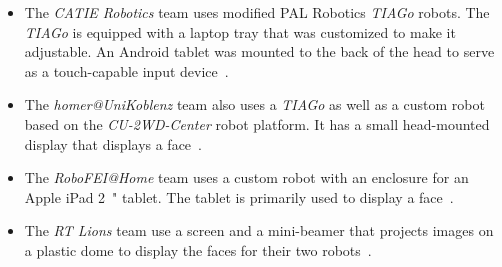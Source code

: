 \begin{itemize}
    \item The \textit{CATIE Robotics} team uses modified PAL Robotics \textit{TIAGo} robots. The
          \textit{TIAGo} is equipped with a laptop tray that was customized to make it adjustable.
          An Android tablet was mounted to the back of the head to serve as a touch-capable input
          device~\cite{catie-robotics-tdp}.
    \item The \textit{homer@UniKoblenz} team also uses a \textit{TIAGo} as well as a custom robot based
          on the \textit{CU-2WD-Center} robot platform. It has a small head-mounted display that displays
          a face~\cite{homer-at-uni-koblenz-tdp}.
    \item The \textit{RoboFEI@Home} team uses a custom robot with an enclosure for an Apple iPad \SI{2}{"}
          tablet. The tablet is primarily used to display a face~\cite{robo-fei-at-home-tdp}.
    \item The \textit{RT Lions} team use a screen and a mini-beamer that projects images on a plastic
          dome to display the faces for their two robots~\cite{rt-lions-tdp}.
\end{itemize}
